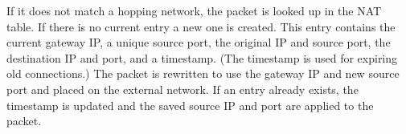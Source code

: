 \par If it does not match a hopping network, the packet is looked up in the NAT table. If there is no current entry a new one is created. This entry contains the current gateway IP, a unique source port, the original IP and source port, the destination IP and port, and a timestamp. (The timestamp is used for expiring old connections.) The packet is rewritten to use the gateway IP and new source port and placed on the external network. If an entry already exists, the timestamp is updated and the saved source IP and port are applied to the packet.

